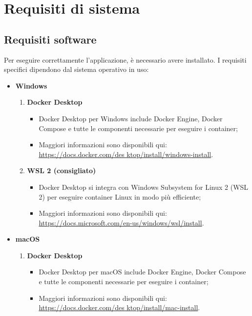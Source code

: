 \section{Requisiti di sistema}

\subsection{Requisiti software}
\par Per eseguire correttamente l'applicazione, è necessario avere  installato. I requisiti specifici dipendono dal sistema operativo in uso:
\begin{itemize}
  \item \textbf{Windows}
  \begin{enumerate}
    \item \textbf{Docker Desktop}
    \begin{itemize}
      \item Docker Desktop per Windows include Docker Engine, Docker Compose e tutte le componenti necessarie per eseguire i container;
      \item Maggiori informazioni sono disponibili qui: \href{https://docs.docker.com/desktop/install/windows-install}{https://docs.docker.com/des \- ktop/install/windows-install}.
    \end{itemize}
    \item \textbf{WSL 2 (consigliato)}
    \begin{itemize}
      \item Docker Desktop si integra con Windows Subsystem for Linux 2 (WSL 2) per eseguire container Linux in modo più efficiente;
      \item Maggiori informazioni sono disponibili qui: \href{https://docs.microsoft.com/en-us/windows/wsl/install}{https://docs.microsoft.com/en-us/windows/wsl/install}.
    \end{itemize}
  \end{enumerate}
  \item \textbf{macOS}
  \begin{enumerate}
    \item \textbf{Docker Desktop}
    \begin{itemize}
      \item Docker Desktop per macOS include Docker Engine, Docker Compose e tutte le componenti necessarie per eseguire i container;
      \item Maggiori informazioni sono disponibili qui: \href{https://docs.docker.com/desktop/install/mac-install}{https://docs.docker.com/des \- ktop/install/mac-install}.

\end{itemize}
\end{enumerate}
\end{itemize}
